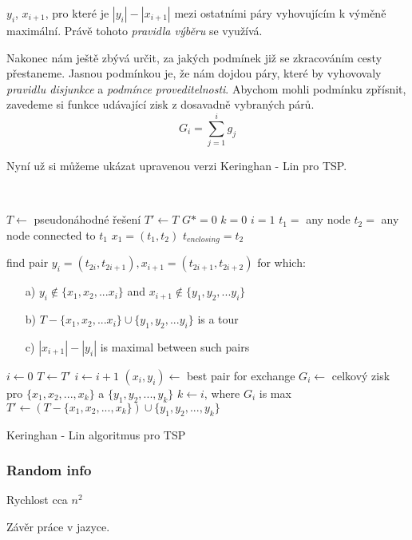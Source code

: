 \documentclass[
  biblatex,
  figures=false,
  glossaries,
  index
]{kidiplom}
\begin{document}
 $y_i$, $x_{i+1}$, pro které je $|y_i| - |x_{i+1}|$ mezi ostatními páry vyhovujícím k výměně maximální. Právě tohoto \textit{pravidla výběru} se využívá. 

Nakonec nám ještě zbývá určit, za jakých podmínek již se zkracováním cesty přestaneme. Jasnou podmínkou je, že nám dojdou páry, které by vyhovovaly \textit{pravidlu disjunkce} a \textit{podmínce proveditelnosti}. Abychom mohli podmínku zpřísnit, zavedeme si funkce udávající zisk z dosavadně vybraných párů.
$$G_i = \sum_{j=1}^{i}g_j$$

Nyní už si můžeme ukázat upravenou verzi Keringhan - Lin pro TSP.
\newline

{\LinesNumbered\SetAlgoNoLine\
\begin{algorithm}[H]
%
$T \leftarrow$ pseudonáhodné řešení\;
$T' \leftarrow T$\;
$G* = 0$\;
$k = 0$\;
$i = 1$\;
$t_1 =$ any node\;
$t_2 =$ any node connected to $t_1$\;
$x_1 = (t_1, t_2)$\;
$t_{enclosing} = t_2$\;
{
find pair $y_i = (t_{2i}, t_{2i+1}), x_{i+1} = (t_{2i+1}, t_{2i+2})$ for which:
{\begin{itemize}
\item[a)] $y_i \notin \{x_1, x_2,... x_i\}$ and $x_{i+1} \notin \{y_1, y_2,... y_i\}$
\item[b)] $T - \{x_1, x_2,... x_i\} \cup \{y_1, y_2,... y_i\}$ is a tour
\item[c)] $|x_{i+1}| - |y_i|$ is maximal between such pairs
\end{itemize}}
$i \leftarrow 0$\;
$T \leftarrow T'$\;
{
$i \leftarrow i + 1$\;
$(x_i, y_i) \leftarrow$ best pair for exchange\;
$G_i \leftarrow$ celkový zisk pro $\{x_1, x_2, ..., x_k\}$ a $\{y_1, y_2, ..., y_k\}$\;
}
$k \leftarrow i$, where $G_i$ is max \;
$T' \leftarrow (T - \{x_1, x_2, ..., x_k\}) \cup \{y_1, y_2, ..., y_k\}$\;
}
\Return \;
\caption{Keringhan - Lin algoritmus pro TSP}
\end{algorithm}}\leavevmode\newline



\subsubsection{Random info}
Rychlost cca $n ^ 2$

\begin{kiconclusions}
Závěr práce v  jazyce.
\end{kiconclusions}
\end{document}

